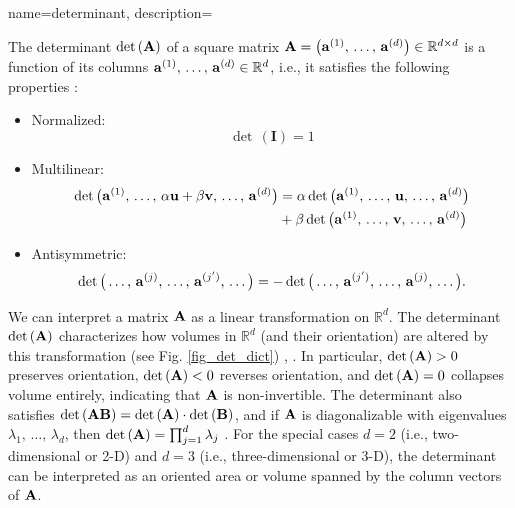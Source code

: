 {name={determinant},
	description={The determinant $\det\,({\bf A})$ of a square matrix 
		${\bf A} =\linebreak \big( {\bf a}^{(1)},\,\ldots,\,{\bf a}^{(d)} \big) \in \mathbb{R}^{d \times d}$ is a 
		function of its columns ${\bf a}^{(1)},\,\ldots,\,{\bf a}^{(d)} \in \mathbb{R}^{d}$, i.e., it satisfies 
		the following properties \cite{DirschmidHansJorg1996TuF}:
		\begin{itemize}
			\item Normalized: $$\det\,(\mathbf{I}) = 1$$ 
			\item Multilinear: \begin{align} \nonumber \det \big({\bf a}^{(1)},\,\ldots,\,\alpha{\bf u}+ \beta {\bf v},\,\ldots,\,{\bf a}^{(d)} \big) & = \alpha\det \big({\bf a}^{(1)},\,\ldots,\,{\bf u},\,\ldots,\,{\bf a}^{(d)} \big) \\ 
			& +\beta\det \big({\bf a}^{(1)},\,\ldots,\,{\bf v},\,\ldots,\,{\bf a}^{(d)} \big) \nonumber
			\end{align}
			\item Antisymmetric: $$\det \big(\ldots,\,{\bf a}^{(j)}, \,\ldots, \,{\bf a}^{(j')},\,\ldots \big) = - \det \big(\ldots,\,{\bf a}^{(j')}, \,\ldots, \,{\bf a}^{(j)},\,\ldots \big).$$ 
		\end{itemize} 
		We can interpret a matrix ${\bf A}$ as a linear transformation on $\mathbb{R}^{d}$.
		The determinant $\det\,({\bf A})$ characterizes how volumes in $\mathbb{R}^d$ (and their orientation) 
		are altered by this transformation (see Fig. \ref{fig_det_dict}) \cite{GolubVanLoanBook}, \cite{Strang2007}. 
 		In particular, $\det\,({\bf A}) > 0$ preserves orientation, $\det\,({\bf A}) < 0$ reverses orientation, 
 		and $\det\,({\bf A}) = 0$ collapses volume entirely, indicating that ${\bf A}$ is non-invertible. 
 		The determinant also satisfies $\det\,({\bf A} {\bf B}) = \det\,({\bf A}) \cdot \det\,({\bf B})$, and if ${\bf A}$ is 
 		diagonalizable with eigenvalues $\lambda_{1}, \,\ldots, \,\lambda_{d}$, then 
		$\det\,({\bf A}) = \prod_{j=1}^{d} \lambda_{j}$ \cite{HornMatAnalysis}.
    		For the special cases $d=2$ (i.e., two-dimensional or 2-D) and $d=3$ (i.e., three-dimensional or 3-D), 
		the determinant can be interpreted as an oriented area or volume spanned by the column vectors of ${\bf A}$.
    		\begin{figure}[H]
    			\begin{center}
    			\begin{tikzpicture}[x=2cm]
			

\end{tikzpicture}
\end{center}
\end{figure}}}
